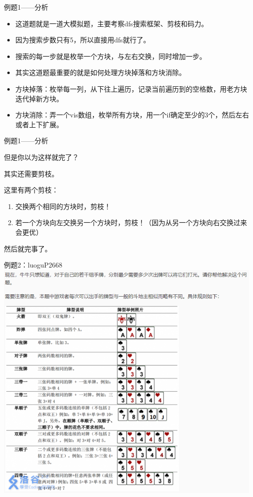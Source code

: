 \documentclass{bemaer}[UTF-8]
\begin{document}
\begin{frame}{例题1——分析}
\begin{itemize}
\item 这道题就是一道大模拟题，主要考察dfs搜索框架、剪枝和码力。
\item 因为搜索步数只有5，所以直接用dfs就行了。
\item 搜索的每一步就是枚举一个方块，与左右交换，同时增加一步。
\item 其实这道题最重要的就是如何处理方块掉落和方块消除。
\item 方块掉落：枚举每一列，从下往上遍历，记录当前遍历到的空格数，用老方块迭代掉新方块。
\item 方块消除：弄一个vis数组，枚举所有方块，用一个if确定至少的3个，然后左右或者上下扩展。
\end{itemize}
\end{frame}

\begin{frame}{例题1——分析}
\item 但是你以为这样就完了？
\item 其实还需要剪枝。
\item 这里有两个剪枝：
\begin{enumerate}
  \item 交换两个相同的方块时，剪枝！
  \item 若一个方块向左交换另一个方块时，剪枝！（因为从另一个方块向右交换过来会更优）
\end{enumerate}
然后就完事了。
\end{frame}

\begin{frame}{例题2：luoguP2668}
\includegraphics{luoguP2668.png}
\end{frame}
\end{document}

